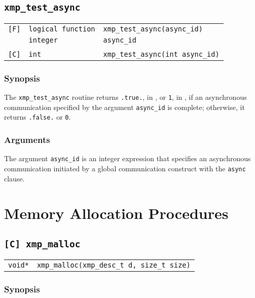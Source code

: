 \subsection{\tt xmp\_test\_async}

\begin{tabular}{lll}

\verb![F]!& {\tt logical function} & {\tt xmp\_test\_async(async\_id)}\\
          & {\tt integer} & {\tt async\_id}\\
          & & \\
\verb![C]!&  {\tt int} & {\tt  xmp\_test\_async(int async\_id)}

\end{tabular}

\subsubsection*{Synopsis}

The {\tt xmp\_test\_async} routine returns {\tt .true.}, in {\XMPF}, or
{\tt 1}, in {\XMPC}, if an asynchronous communication specified by the
argument {\tt async\_id} is complete; otherwise, it returns {\tt .false.}
or {\tt 0}.

\subsubsection*{Arguments}

The argument {\tt async\_id} is an integer expression that specifies an
asynchronous communication initiated by a global communication construct
with the {\tt async} clause.


\section{Memory Allocation Procedures}

\subsection{\tt [C] xmp\_malloc}
\label{subsec: xmp_malloc}

\begin{tabular}{ll}

{\tt void*} & {\tt xmp\_malloc(xmp\_desc\_t d, size\_t size)}

\end{tabular}

\subsubsection*{Synopsis}

